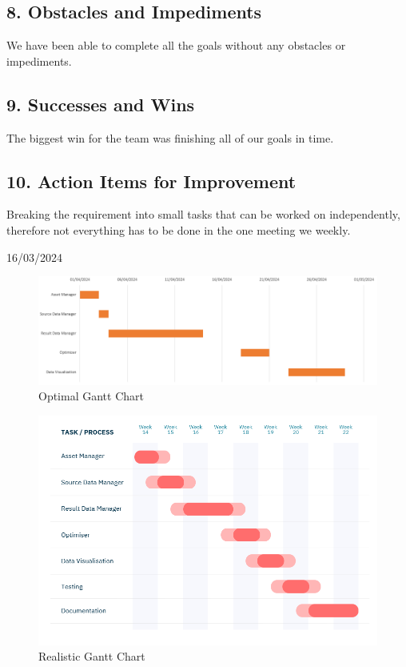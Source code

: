 \documentclass[12pt]{report}
\begin{document}
\subsection*{8. Obstacles and Impediments}
We have been able to complete all the goals without any obstacles or impediments.
\subsection*{9. Successes and Wins}
The biggest win for the team was finishing all of our goals in time.
\subsection*{10. Action Items for Improvement}
Breaking the requirement into small tasks that can be worked on independently, therefore not everything has to be done in the one meeting we weekly.

\hfill 16/03/2024


\begin{figure}[H]
  \centering
  \includegraphics[width=1\textwidth]{Resources/1-Sprint/Gantt-Chart-Optimal.png}
  \caption{Optimal Gantt Chart}
  \label{fig:OptGanttChart}
\end{figure}

\begin{figure}[H]
  \centering
  \includegraphics[width=1\textwidth]{Resources/1-Sprint/Gantt-Chart-Realistic.png}
  \caption{Realistic Gantt Chart}
  \label{fig:RealGanttChart}
\end{figure}
\clearpage
\end{document}
